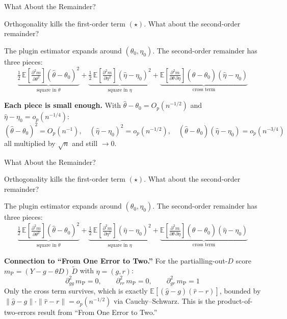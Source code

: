 \documentclass[aspectratio=169, 11pt, handout]{beamer}
\newcommand{\E}{\mathbb{E}}
\begin{document}
\begin{frame}{What About the Remainder?}

Orthogonality kills the first-order term $(\star)$. What about the second-order remainder?

\pause

The plugin estimator expands around $(\theta_0, \eta_0)$. The second-order remainder has three pieces:
\[
\underbrace{\tfrac{1}{2}\,\E\!\left[\tfrac{\partial^2 m}{\partial \theta^2}\right](\hat\theta - \theta_0)^2}_{\text{square in }\theta} + \underbrace{\tfrac{1}{2}\,\E\!\left[\tfrac{\partial^2 m}{\partial \eta^2}\right](\hat\eta - \eta_0)^2}_{\text{square in }\eta} + \underbrace{\E\!\left[\tfrac{\partial^2 m}{\partial \theta\,\partial \eta}\right](\hat\theta - \theta_0)(\hat\eta - \eta_0)}_{\text{cross term}}
\]

\pause

\textbf{Each piece is small enough.} With $\hat\theta - \theta_0 = O_p(n^{-1/2})$ and $\hat\eta - \eta_0 = o_p(n^{-1/4})$:
\[
(\hat\theta - \theta_0)^2 = O_p(n^{-1}), \quad (\hat\eta - \eta_0)^2 = o_p(n^{-1/2}), \quad (\hat\theta - \theta_0)(\hat\eta - \eta_0) = o_p(n^{-3/4})
\]
all multiplied by $\sqrt n$ and still $\to 0$.

\end{frame}





\begin{frame}{What About the Remainder?}

Orthogonality kills the first-order term $(\star)$. What about the second-order remainder?

\pause

The plugin estimator expands around $(\theta_0, \eta_0)$. The second-order remainder has three pieces:
\[
\underbrace{\tfrac{1}{2}\,\E\!\left[\tfrac{\partial^2 m}{\partial \theta^2}\right](\hat\theta - \theta_0)^2}_{\text{square in }\theta} + \underbrace{\tfrac{1}{2}\,\E\!\left[\tfrac{\partial^2 m}{\partial \eta^2}\right](\hat\eta - \eta_0)^2}_{\text{square in }\eta} + \underbrace{\E\!\left[\tfrac{\partial^2 m}{\partial \theta\,\partial \eta}\right](\hat\theta - \theta_0)(\hat\eta - \eta_0)}_{\text{cross term}}
\]

\pause
\bigskip

\textbf{Connection to ``From One Error to Two.''} For the partialling-out-$D$ score $m_{\text{P}} = (Y - g - \theta D)\,\tilde D$ with $\eta = (g, r)$:
\[
\partial^2_{gg}\, m_{\text{P}} = 0, \qquad \partial^2_{rr}\, m_{\text{P}} = 0, \qquad \partial^2_{gr}\, m_{\text{P}} = 1
\]
Only the cross term survives, which is exactly $\E[(\hat g - g)(\hat r - r)]$, bounded by $\|\hat g - g\|\cdot\|\hat r - r\| = o_p(n^{-1/2})$ via Cauchy–Schwarz. This is the product-of-two-errors result from ``From One Error to Two.''

\end{frame}
\end{document}
